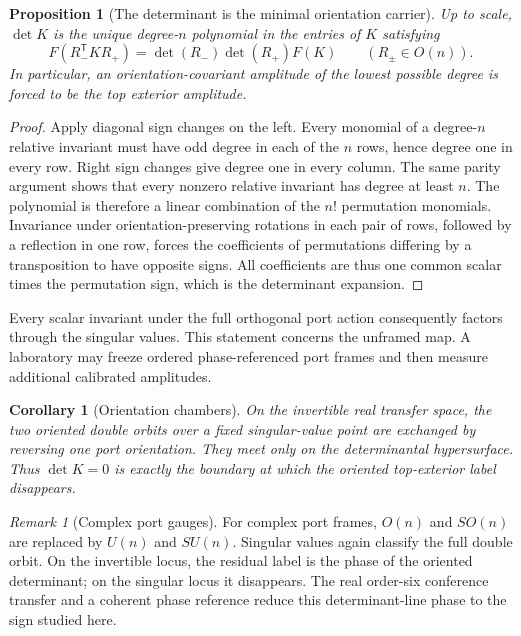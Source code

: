 \documentclass[11pt]{article}
\newtheorem{proposition}[theorem]{Proposition}
\newtheorem{corollary}[theorem]{Corollary}
\theoremstyle{remark}
\newtheorem{remark}[theorem]{Remark}
\begin{document}
\begin{proposition}[The determinant is the minimal orientation carrier]
\label{prop:unique-orientation-carrier}
Up to scale, \(\det K\) is the unique degree-\(n\) polynomial in the entries
of \(K\) satisfying
\[
 F(R_-^{\mathsf T}KR_+)
 =\det(R_-)\det(R_+)F(K)
 \qquad (R_\pm\in O(n)).
\]
In particular, an orientation-covariant amplitude of the lowest possible
degree is forced to be the top exterior amplitude.
\end{proposition}

\begin{proof}
Apply diagonal sign changes on the left.  Every monomial of a degree-\(n\)
relative invariant must have odd degree in each of the \(n\) rows, hence
degree one in every row.  Right sign changes give degree one in every column.
The same parity argument shows that every nonzero relative invariant has
degree at least \(n\).
The polynomial is therefore a linear combination of the \(n!\) permutation
monomials.  Invariance under orientation-preserving rotations in each pair of
rows, followed by a reflection in one row, forces the coefficients of
permutations differing by a transposition to have opposite signs.  All
coefficients are thus one common scalar times the permutation sign, which is
the determinant expansion.
\end{proof}

Every scalar invariant under the full orthogonal port action consequently
factors through the singular values.  This statement concerns the unframed
map.  A laboratory may freeze ordered phase-referenced port frames and then
measure additional calibrated amplitudes.

\begin{corollary}[Orientation chambers]
On the invertible real transfer space, the two oriented double orbits over a
fixed singular-value point are exchanged by reversing one port orientation.
They meet only on the determinantal hypersurface.  Thus \(\det K=0\) is
exactly the boundary at which the oriented top-exterior label disappears.
\end{corollary}

\begin{remark}[Complex port gauges]
For complex port frames, \(O(n)\) and \(SO(n)\) are replaced by \(U(n)\) and
\(SU(n)\).  Singular values again classify the full double orbit.  On the
invertible locus, the residual label is the phase of the oriented determinant;
on the singular locus it disappears.  The real order-six conference transfer and a coherent
phase reference reduce this determinant-line phase to the sign studied here.
\end{remark}
\end{document}
